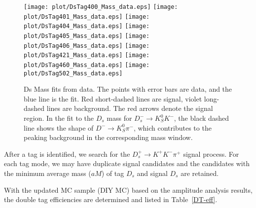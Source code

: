 \begin{figure*}[!htbp]
 \centering
 \texttt{[image: plot/DsTag400\_Mass\_data.eps]}
 \texttt{[image: plot/DsTag401\_Mass\_data.eps]}
 \texttt{[image: plot/DsTag404\_Mass\_data.eps]}
 \texttt{[image: plot/DsTag405\_Mass\_data.eps]}
 \texttt{[image: plot/DsTag406\_Mass\_data.eps]}
 \texttt{[image: plot/DsTag421\_Mass\_data.eps]}
 \texttt{[image: plot/DsTag460\_Mass\_data.eps]}
 \texttt{[image: plot/DsTag502\_Mass\_data.eps]}
 \caption{Ds Mass fits from data. The points with error bars are data, and the blue line is the fit. Red short-dashed lines are signal, violet long-dashed lines are background. The red arrows denote the signal region. In the fit to the $D_{s}$ mass for $D_{s}^{-} \rightarrow K_{S}^{0}K^{-}$, the black dashed line shows the shape of $D^{-} \rightarrow K_{S}^{0}\pi^{-}$, which contributes to the peaking background in the corresponding mass window.}
\label{SingleTagFit}
\end{figure*}


After a tag is identified, we search for the $D_{s}^{+} \rightarrow K^{+}K^{-}\pi^{+}$ signal process. 
For each tag mode, we may have duplicate signal candidates and the candidates with the minimum average mass ($aM$) of tag $D_{s}$ and signal $D_{s}$ are retained.


With the updated MC sample (DIY MC) based on the amplitude analysis results, the double tag efficiencies are determined and listed in Table~\ref{DT-eff}.

